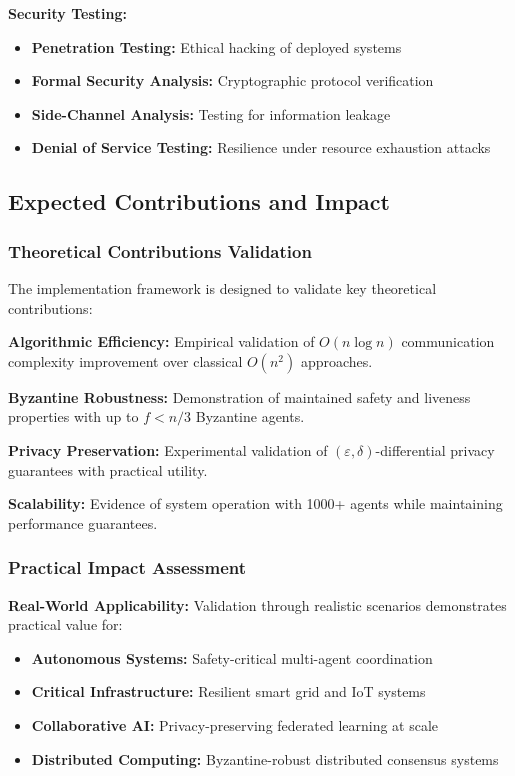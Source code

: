 \documentclass[conference]{IEEEtran}
\newcommand{\epsilon}{\varepsilon}
\begin{document}
\textbf{Security Testing:}
\begin{itemize}
    \item \textbf{Penetration Testing:} Ethical hacking of deployed systems
    \item \textbf{Formal Security Analysis:} Cryptographic protocol verification
    \item \textbf{Side-Channel Analysis:} Testing for information leakage
    \item \textbf{Denial of Service Testing:} Resilience under resource exhaustion attacks
\end{itemize}

\subsection{Expected Contributions and Impact}

\subsubsection{Theoretical Contributions Validation}

The implementation framework is designed to validate key theoretical contributions:

\textbf{Algorithmic Efficiency:} Empirical validation of $O(n \log n)$ communication complexity improvement over classical $O(n^2)$ approaches.

\textbf{Byzantine Robustness:} Demonstration of maintained safety and liveness properties with up to $f < n/3$ Byzantine agents.

\textbf{Privacy Preservation:} Experimental validation of $(\epsilon, \delta)$-differential privacy guarantees with practical utility.

\textbf{Scalability:} Evidence of system operation with 1000+ agents while maintaining performance guarantees.

\subsubsection{Practical Impact Assessment}

\textbf{Real-World Applicability:} Validation through realistic scenarios demonstrates practical value for:
\begin{itemize}
    \item \textbf{Autonomous Systems:} Safety-critical multi-agent coordination
    \item \textbf{Critical Infrastructure:} Resilient smart grid and IoT systems  
    \item \textbf{Collaborative AI:} Privacy-preserving federated learning at scale
    \item \textbf{Distributed Computing:} Byzantine-robust distributed consensus systems
\end{itemize}
\end{document}
